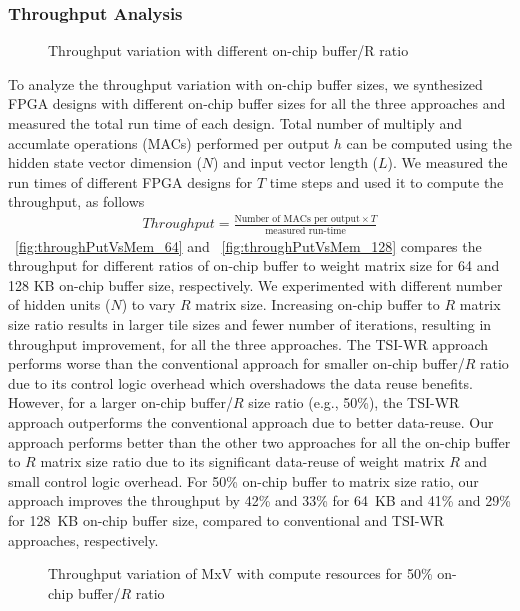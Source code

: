 {{{\subsubsection{Throughput Analysis}
\begin{figure}[htb!]
	\centering
	   \hspace{2.0em}
	\caption{Throughput variation with different on-chip buffer/R ratio}	\label{fig:throughputVsMem}
\end{figure}
To analyze the throughput variation with on-chip buffer sizes, we synthesized FPGA designs with different on-chip buffer sizes for all the three approaches and measured the total run time of each design. Total number of multiply and accumlate operations (MACs) performed per output $h$ can be computed using the hidden state vector dimension ($N$) and input vector length ($L$). We measured the run times of different FPGA designs for $T$ time steps and used it to compute the throughput, as follows 
\begin{align}\label{eq:througput}
	Throughput{=}\frac{\text{Number of MACs per output}{\times}T}{\text{measured run-time}}
\end{align}
\figurename{~\ref{fig:throughPutVsMem_64}} and \figurename{~\ref{fig:throughPutVsMem_128}} compares the throughput for different ratios of on-chip buffer to weight matrix size for 64 and 128 KB on-chip buffer size, respectively.  We experimented with different number of hidden units ($N$) to vary $R$ matrix size. Increasing on-chip buffer to $R$ matrix size ratio results in larger tile sizes and fewer number of iterations, resulting in throughput improvement, for all the three approaches. The TSI-WR approach performs worse than the conventional approach for smaller on-chip buffer/$R$ ratio due to its control logic overhead which overshadows the data reuse benefits. However, for a larger on-chip buffer/$R$ size ratio (e.g., 50\%), the TSI-WR approach outperforms the conventional approach due to better data-reuse. Our approach performs better than the other two approaches for all the on-chip buffer to $R$ matrix size ratio due to its significant data-reuse of weight matrix $R$ and small control logic overhead.
For 50\% on-chip buffer to matrix size ratio, our approach improves the throughput by 42\% and 33\% for 64~KB and 41\% and 29\% for 128~KB on-chip buffer size, compared to conventional and TSI-WR approaches, respectively.
\begin{figure}[htb!]
	\centering
   \hspace{2.0em}
	\caption{Throughput variation of MxV with compute resources for 50\% on-chip buffer/$R$ ratio}	\label{fig:throughputVsPF}
\end{figure}
}}}
